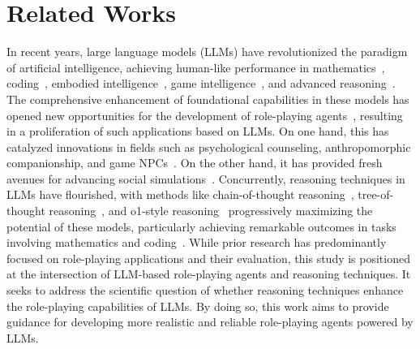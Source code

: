 \section{Related Works}

In recent years, large language models (LLMs) have revolutionized the paradigm of artificial intelligence, achieving human-like performance in mathematics~\citep{liu2023mathematical,shao2024deepseekmath}, coding~\citep{luo2023wizardcoder,roziere2023code,guo2024deepseek,zhu2024deepseek}, embodied intelligence~\citep{wang2023voyager,liu2024aligning}, game intelligence~\citep{hu2024survey,feng2024survey}, and advanced reasoning~\citep{chu2023survey,xu2025towards}. 
The comprehensive enhancement of foundational capabilities in these models has opened new opportunities for the development of role-playing agents~\citep{chen2024persona}, resulting in a proliferation of such applications based on LLMs.
On one hand, this has catalyzed innovations in fields such as psychological counseling, anthropomorphic companionship, and game NPCs~\citep{tseng2024two}. 
On the other hand, it has provided fresh avenues for advancing social simulations~\citep{mou2024individual}. 
Concurrently, reasoning techniques in LLMs have flourished, with methods like chain-of-thought reasoning~\citep{wei2022chain}, tree-of-thought reasoning~\citep{yao2024tree}, and o1-style reasoning~\citep{jaech2024openai} progressively maximizing the potential of these models, particularly achieving remarkable outcomes in tasks involving mathematics and coding~\citep{guo2025deepseek,team2025kimi}.
While prior research has predominantly focused on role-playing applications and their evaluation, this study is positioned at the intersection of LLM-based role-playing agents and reasoning techniques. 
It seeks to address the scientific question of whether reasoning techniques enhance the role-playing capabilities of LLMs. 
By doing so, this work aims to provide guidance for developing more realistic and reliable role-playing agents powered by LLMs.